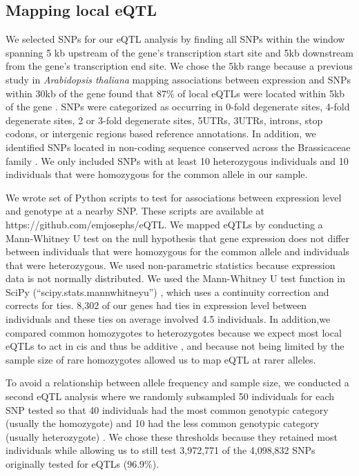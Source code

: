 \subsection{Mapping local eQTL}
We selected SNPs for our eQTL analysis by finding all SNPs within the window spanning 5 kb upstream of the gene’s transcription start site and 5kb downstream from the gene’s transcription end site. We chose the 5kb range because a previous study in \textit{Arabidopsis thaliana} mapping associations between expression and SNPs within 30kb of the gene found that 87\% of local eQTLs were located within 5kb of the gene \citep{Gan2011-xv}. SNPs were categorized as occurring in 0-fold degenerate sites, 4-fold degenerate sites, 2 or 3-fold degenerate sites, 5\textsc{}UTRs, 3\textsc{}UTRs, introns, stop codons, or intergenic regions based reference annotations\citep{Slotte2013-py}. In addition, we identified SNPs located in non-coding sequence conserved across the Brassicaceae family \citep{Haudry2013-qe}. We only included SNPs with at least 10 heterozygous individuals and 10 individuals that were homozygous for the common allele in our sample.

We wrote set of Python scripts to test for associations between expression level and genotype at a nearby SNP. These scripts are available at https://github.com/emjosephs/eQTL. We mapped eQTLs by conducting a Mann-Whitney U test on the null hypothesis that gene expression does not differ between individuals that were homozygous for the common allele and individuals that were heterozygous. We used non-parametric statistics because expression data is not normally distributed. We used the Mann-Whitney U test function in SciPy (“scipy.stats.mannwhitneyu”) \citep{Jones2001-in}, which uses a continuity correction and corrects for ties. 8,302 of our genes had ties in expression level between individuals and these ties on average involved 4.5 individuals. In addition,we compared common homozygotes to heterozygotes because we expect most local eQTLs to act in cis and thus be additive \citep{Pickrell2010-ci}, and because not being limited by the sample size of rare homozygotes allowed us to map eQTL at rarer alleles. 

To avoid a relationship between allele frequency and sample size, we conducted a second eQTL analysis where we randomly subsampled 50 individuals for each SNP tested so that 40 individuals had the most common genotypic category (usually the homozygote) and 10 had the less common genotypic category (usually heterozygote) \citep{Battle2014-ke}. We chose these thresholds because they retained most individuals while allowing us to still test 3,972,771 of the 4,098,832 SNPs originally tested for eQTLs (96.9\%).

